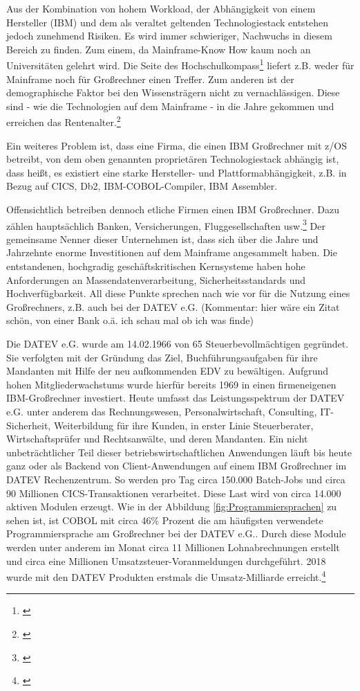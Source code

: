 Aus der Kombination von hohem Workload, der Abhängigkeit von einem Hersteller (IBM) und dem als veraltet geltenden Technologiestack entstehen jedoch zunehmend Risiken.
Es wird immer schwieriger, Nachwuchs in diesem Bereich zu finden.
Zum einem, da Mainframe-Know How kaum noch an Universitäten gelehrt wird.
Die Seite des Hochschulkompass\footnote{\cite{.09.02.2020}} liefert z.B. weder für \glqq Mainframe\grqq{} noch für \glqq Großrechner\grqq{} einen Treffer.
Zum anderen ist der demographische Faktor bei den Wissensträgern nicht zu vernachlässigen. Diese sind - wie die Technologien auf dem Mainframe - in die Jahre gekommen und erreichen das Rentenalter.\footnote{\cite{.25.2.2020f}}

Ein weiteres Problem ist, dass eine Firma, die einen IBM Großrechner mit z/OS betreibt, von dem oben genannten proprietären Technologiestack abhängig ist, dass heißt, es existiert eine starke Hersteller- und Plattformabhängigkeit, z.B. in Bezug auf CICS, Db2, IBM-COBOL-Compiler, IBM Assembler.

Offensichtlich betreiben dennoch etliche Firmen einen IBM Großrechner.
Dazu zählen hauptsächlich Banken, Versicherungen, Fluggesellschaften usw.\footnote{\cite{.25.2.2020c}}
Der gemeinsame Nenner dieser Unternehmen ist, dass sich über die Jahre und Jahrzehnte enorme Investitionen auf dem Mainframe angesammelt haben.
Die entstandenen, hochgradig geschäftskritischen Kernsysteme haben hohe Anforderungen an Massendatenverarbeitung, Sicherheitsstandards und Hochverfügbarkeit.
All diese Punkte sprechen nach wie vor für die Nutzung eines Großrechners, z.B. auch bei der DATEV e.G. (Kommentar: hier wäre ein Zitat schön, von einer Bank o.ä. ich schau mal ob ich was finde)

Die DATEV e.G. wurde am 14.02.1966 von 65 Steuerbevollmächtigen gegründet.
Sie verfolgten mit der Gründung das Ziel, Buchführungsaufgaben für ihre Mandanten mit Hilfe der neu aufkommenden EDV zu bewältigen.
Aufgrund hohen Mitgliederwachstums wurde hierfür bereits 1969 in einen firmeneigenen IBM-Großrechner investiert.\cite{.25.11.2019c}
Heute umfasst das Leistungsspektrum der DATEV e.G. unter anderem das Rechnungswesen, Personalwirtschaft, Consulting, IT-Sicherheit, Weiterbildung für ihre Kunden, in erster Linie Steuerberater, Wirtschaftsprüfer und Rechtsanwälte, und deren Mandanten.
Ein nicht unbeträchtlicher Teil dieser betriebswirtschaftlichen Anwendungen läuft bis heute ganz oder als Backend von Client-Anwendungen auf einem IBM Großrechner im DATEV Rechenzentrum.
So werden pro Tag circa 150.000 \Glspl{Batch-Job} und circa 90 Millionen CICS-Transaktionen verarbeitet.
Diese Last wird von circa 14.000 aktiven Modulen erzeugt.
Wie in der Abbildung \ref{fig:Programmiersprachen} zu sehen ist, ist COBOL mit circa 46\% Prozent die am häufigsten verwendete Programmiersprache am Großrechner bei der DATEV e.G..
Durch diese Module werden unter anderem im Monat circa 11 Millionen Lohnabrechnungen erstellt und circa eine Millionen Umsatzsteuer-Voranmeldungen durchgeführt. 
2018 wurde mit den DATEV Produkten erstmals die Umsatz-Milliarde erreicht.\footnote{\cite{.27.2.2020b}}

